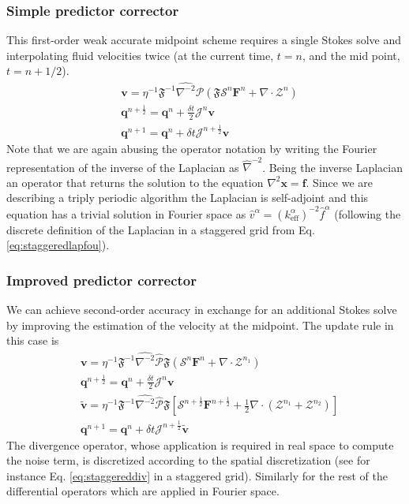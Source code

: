 \documentclass[ twoside,openright,titlepage,numbers=noenddot,%
headinclude,footinclude,cleardoublepage=empty,abstract=on,
BCOR=5mm,paper=b5,fontsize=11pt, dvipsnames
]{scrreprt}
\renewcommand{\vec}[1]{\bm{#1}}
\newcommand{\oper}[1]{\mathcal{#1}}
\newcommand{\dt}{\delta t}
\newcommand{\half}{\frac{1}{2}}
\newcommand{\fou}[1]{\widehat{#1}}
\newcommand{\ppos}{q}
\newcommand{\fvel}{v}
\begin{document}
\subsubsection*{Simple predictor corrector}
This first-order weak accurate midpoint scheme requires a single Stokes solve and interpolating fluid velocities twice (at the current time, $t=n$, and the mid point, $t=n+1/2$).
\begin{equation}
  \begin{aligned}
    &\vec{\fvel} = \eta^{-1}\mathfrak{F}^{-1}\fou{\nabla^{-2}}\fou{\oper{P}}(\mathfrak{F}\oper{S}^{n}\vec{F}^{n} + \nabla\cdot\mathcal{Z}^{n})\\
    &\vec{\ppos}^{n+\half} = \vec{\ppos}^n + \frac{\dt}{2}\oper{J}^n\vec{\fvel}\\
    &\vec{\ppos}^{n+1} = \vec{\ppos}^n + \dt\oper{J}^{n+\half}\vec{\fvel}
  \end{aligned}
\end{equation}
Note that we are again abusing the operator notation by writing the Fourier representation of the inverse of the Laplacian as $\fou\nabla^{-2}$. Being the inverse Laplacian an operator that returns the solution to the equation $\nabla^2\vec{x} = \vec{f}$. Since we are describing a triply periodic algorithm the Laplacian is self-adjoint and this equation has a trivial solution in Fourier space as $\fou{v}^\alpha = \left(k_{\text{eff}}^\alpha\right)^{-2}\fou{f}^\alpha$ (following the discrete definition of the Laplacian in a staggered grid from Eq. \eqref{eq:staggeredlapfou}).
\subsubsection*{Improved predictor corrector}
We can achieve second-order accuracy in exchange for an additional Stokes solve by improving the estimation of the velocity at the midpoint. The update rule in this case is 
\begin{equation}
  \begin{aligned}
    &\vec{\fvel} = \eta^{-1}\mathfrak{F}^{-1}\fou{\nabla^{-2}}\fou{\oper{P}}\mathfrak{F}(\oper{S}^{n}\vec{F}^{n} + \nabla\cdot\mathcal{Z}^{n_1})\\
    &\vec{\ppos}^{n+\half} = \vec{\ppos}^n + \frac{\dt}{2}\oper{J}^n\vec{\fvel}\\
    &\tilde{\vec{\fvel}}= \eta^{-1}\mathfrak{F}^{-1}\fou{\nabla^{-2}}\fou{\oper{P}}\mathfrak{F}\left[\oper{S}^{n+\half}\vec{F}^{n+\half} + \half\nabla\cdot\left(\mathcal{Z}^{n_1} +  \mathcal{Z}^{n_2}\right)\right]\\
    &\vec{\ppos}^{n+1}= \vec{\ppos}^n + \dt\oper{J}^{n+\half}\tilde{\vec{\fvel}}
  \end{aligned}      
\end{equation}
The divergence operator, whose application is required in real space to compute the noise term, is discretized according to the spatial discretization (see for instance Eq. \eqref{eq:staggereddiv} in a staggered grid). Similarly for the rest of the differential operators which are applied in Fourier space.
\end{document}
